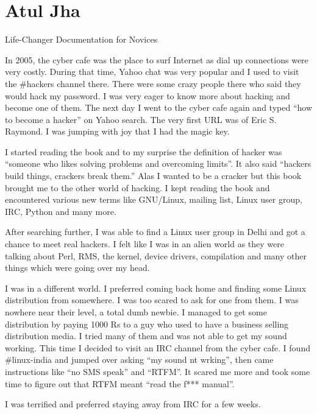 
\chapter{Atul Jha}{Life-Changer Documentation for Novices}

In 2005, the cyber cafe was the place to surf Internet as dial up connections
were very costly. During that time, Yahoo chat was very popular and I used to
visit the \#hackers channel there. There were some crazy people there who said they
would hack my password. I was very eager to know more about hacking and become
one of them. The next day I went to the cyber cafe again and typed ``how to become a
hacker'' on Yahoo search. The very first URL was of Eric S. Raymond. I was jumping
with joy that I had the magic key.
 
I started reading the book and to my surprise the definition of hacker was
``someone who likes solving problems and overcoming limits''. It also said
``hackers build things, crackers break them.'' Alas I wanted to be a cracker but
this book brought me to the other world of hacking. I kept reading the book and
encountered various new terms like GNU/Linux, mailing list, Linux user group,
IRC, Python and many more. 

After searching further, I was able to find a Linux user group in
Delhi and got a chance to meet real hackers. I felt like I was in an
alien world as they were talking about Perl, RMS, the kernel, device
drivers, compilation and many other things which were going over my
head.

I was in a different world. I preferred coming back home and finding some
Linux distribution from somewhere. I was too scared to ask for one
from them. I was nowhere near their level, a total dumb newbie. I managed to get some
distribution by paying 1000 Rs to a guy who used to have a business
selling distribution media. I tried many of them and was not able to
get my sound working. This time I decided to visit an IRC channel from
the cyber cafe. I found \#linux-india and jumped over asking ``my sound
nt wrking'', then came instructions like ``no SMS speak'' and ``RTFM''. It
scared me more and took some time to figure out that RTFM meant ``read the
f*** manual''.

I was terrified and preferred staying away from IRC for a few weeks.

